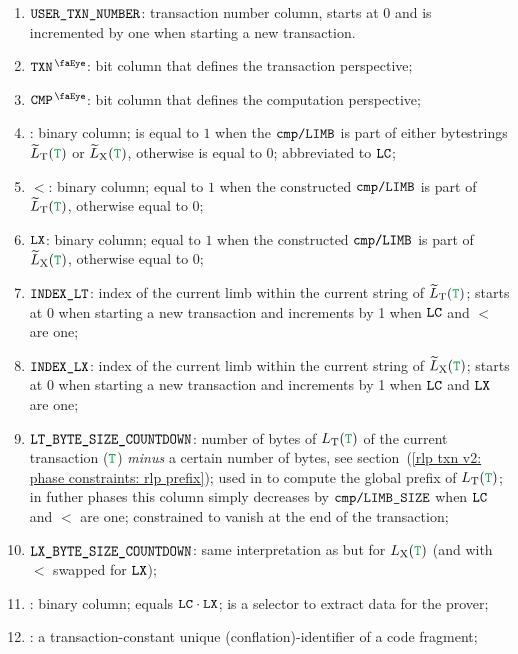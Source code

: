 \begin{enumerate}
    \item $\texttt{USER}\texttt{\_}\texttt{TXN\_NUMBER}$:
	transaction number column, starts at 0 and is incremented by one when starting a new transaction.
    \item $\isTxn$:
	bit column that defines the transaction perspective;
    \item $\isCmp$:
	bit column that defines the computation perspective;
    \item {}:
	binary column;
	is equal to $1$ when the $\texttt{cmp}\texttt{/}\texttt{{\texttt{LIMB}}}$ is part of either \rlp{} bytestrings $\locLtTilde(\locTransaction)$ or $\locLxTilde(\locTransaction)$, otherwise is equal to $0$;
	abbreviated to $\texttt{LC}$;
    \item $\lt$:
	binary column; equal to $1$ when the constructed $\texttt{cmp}\texttt{/}\texttt{{\texttt{LIMB}}}$ is part of $\locLtTilde(\locTransaction)$, otherwise equal to $0$;
    \item $\texttt{LX}$:
	binary column; equal to $1$ when the constructed $\texttt{cmp}\texttt{/}\texttt{{\texttt{LIMB}}}$ is part of $\locLxTilde(\locTransaction)$, otherwise equal to $0$;
    \item $\texttt{INDEX\_LT}$:
	index of the current limb within the current string of $\locLtTilde(\locTransaction)$;
	starts at $0$ when starting a new transaction and increments by 1 when $\texttt{LC}$ and $\lt$ are one; 
    \item $\texttt{INDEX\_LX}$:                                                       
	index of the current limb within the current string of $\locLxTilde(\locTransaction)$;
	starts at $0$ when starting a new transaction and increments by 1 when $\texttt{LC}$ and $\texttt{LX}$ are one;
    \item $\texttt{LT\_BYTE\_SIZE\_COUNTDOWN}$:
	number of bytes of $L_{\mathrm{T}}(\locTransaction)$ of the current transaction ($\locTransaction$) \emph{minus} a certain number of bytes,
	see section~(\ref{rlp txn v2: phase constraints: rlp prefix});
	used in \phaseRlpPrefix{} to compute the global \rlp{} prefix of $L_{\mathrm{T}}(\locTransaction)$;
	in futher phases this column simply decreases by $\texttt{cmp}\texttt{/}\texttt{{LIMB\_SIZE}}$ when $\texttt{LC}$ and $\lt$ are one;
	constrained to vanish at the end of the transaction;
    \item $\texttt{LX\_BYTE\_SIZE\_COUNTDOWN}$:
	same interpretation as \ltByteSizeCountDown{} but for $L_{\mathrm{X}}(\locTransaction)$
	(and with $\lt$ swapped for $\texttt{LX}$);
    \item \toHashByProver{}:
	binary column; equals $\texttt{LC} \cdot \texttt{LX}$; is a selector to extract data for the prover;
    \item \CFI{}:
	a transaction-constant unique (conflation)-identifier of a code fragment;
\end{enumerate}
